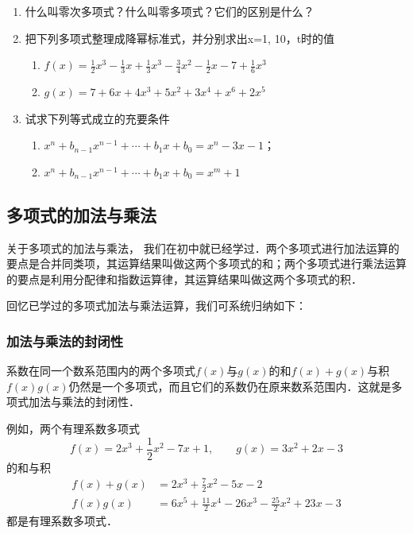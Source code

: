 \begin{ex}
\begin{enumerate}
    \item 
    什么叫零次多项式？什么叫零多项式？它们的区别是什么？
    \item 把下列多项式整理成降幂标准式，并分别求出x=1, 10，t时的值
    \begin{enumerate}
        \item $f (x) =\frac{1}{2}x^3-\frac{1}{3}x+\frac{1}{3}x^3-\frac{3}{4}x^2-\frac{1}{2}x-7+\frac{1}{6}x^3$
        \item $g(x)=7+6x+4x^3+5x^2+3x^4+x^6+2x^5$
    \end{enumerate}  
    \item 试求下列等式成立的充要条件
    \begin{enumerate}
        \item $x^n+b_{n-1}x^{n-1}+\cdots+b_1x+b_0=x^n-3x-1$；
        \item $x^n+b_{n-1}x^{n-1}+\cdots+b_1x+b_0=x^m+1$
    \end{enumerate}
\end{enumerate}
\end{ex}

\subsection{多项式的加法与乘法}

关于多项式的加法与乘法，
我们在初中就已经学过．两个多项式进行加法运算的要点是合并同类项，其运算结果叫做这两个多项式的和；两个多项式进行乘法运算的要点是利用分配律和指数运算律，其运算结果叫做这两个多项式的积．

回忆已学过的多项式加法与乘法运算，我们可系统归纳如下：

\subsubsection{加法与乘法的封闭性}

系数在同一个数系范围内的两个多项式$f(x)$与$g(x)$的和$f(x)+g(x)$与积$f(x)g(x)$仍然是一个多项式，而且它们的系数仍在原来数系范围内．这就是多项式加法与乘法的封闭性．

例如，两个有理系数多项式
\[f(x)=2x^3+\frac{1}{2}x^2-7x+1,\qquad g(x)=3x^2+2x-3\]
的和与积
\[\begin{split}
    f(x)+g(x)&=2x^3+\frac{7}{2}x^2-5x-2\\
    f(x)g(x)&=6x^5+\frac{11}{2}x^4-26x^3-\frac{25}{2}x^2+23x-3
\end{split}\]
都是有理系数多项式．


